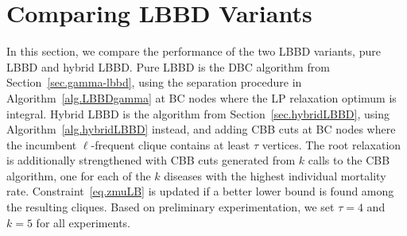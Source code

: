 \section{Comparing LBBD Variants}\label{sec.lbbds}

In this section, we compare the performance of the two LBBD variants, pure LBBD and hybrid
LBBD. Pure LBBD is the DBC algorithm from
Section~\ref{sec.gamma-lbbd}, using the separation procedure in
Algorithm~\ref{alg.LBBDgamma} at BC nodes where the LP relaxation
optimum is integral. Hybrid LBBD is the algorithm from
Section~\ref{sec.hybridLBBD}, using Algorithm~\ref{alg.hybridLBBD}
instead, and adding CBB cuts at BC nodes where the incumbent
$\ell$-frequent clique contains at least $\tau$ vertices. The root
relaxation is additionally strengthened with CBB cuts generated from
$k$ calls to the CBB algorithm, one for each of the $k$ diseases with
the highest individual mortality rate. Constraint~\eqref{eq.zmuLB} is
updated if a better lower bound is found among the resulting cliques.
Based on preliminary experimentation, we set $\tau = 4$ and $k = 5$
for all experiments.

\begin{table}[htpb]
\centering
{}
  \caption{\label{tab.SumG} Summary of Results from the Pure LBBD}
\end{table}

